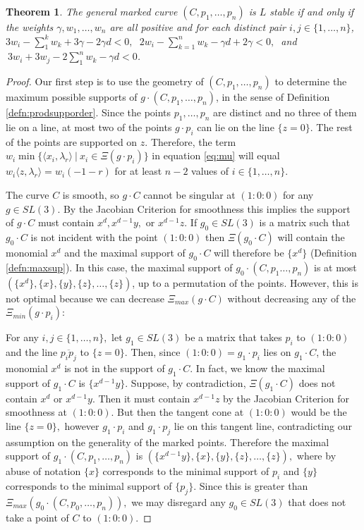\documentclass{amsart}
\numberwithin{equation}{section}
\newtheorem{thm}[prop]{Theorem}
\theoremstyle{definition}
\begin{document}
\begin{thm}\label{thm:generic}
The general marked curve $(C,p_1, \dots, p_n)$ is $L$ stable if and only if the weights $\gamma, w_1, \dots , w_n$ are all positive and for each distinct pair $i,j \in \{1, \dots , n\}$, $3w_i - \sum_1^k w_k + 3 \gamma -2 \gamma d < 0, \  $ $2w_i - \sum_{k=1}^n w_k - \gamma d + 2 \gamma < 0,  \ $ and $ \ 3w_i + 3w_j - 2 \sum_1^n w_k - \gamma d < 0$.
    
\end{thm}
\begin{proof}
 Our first step is to use the geometry of $(C,p_1, \dots , p_n)$ to determine the maximum possible supports of $g \cdot (C,p_1, \dots , p_n)$, in the sense of Definition \ref{defn:prodsupporder}. Since the points $p_1, \dots , p_n$ are distinct and no three of them lie on a line, at most two of the points $g \cdot p_i$ can lie on the line $\{z=0\}.$ The rest of the points are supported on $z$. Therefore, the term $w_i \min \{ \langle x_i , \lambda_r \rangle \ | \ x_i \in \Xi(g \cdot p_i) \}$ in equation \ref{eq:mu} will equal $w_i \langle z, \lambda_r \rangle = w_i(-1-r)$ for at least $n-2$ values of $i \in \{1, \dots, n\}$.
      
      The curve $C$ is smooth, so $g \cdot C$ cannot be singular at $(1:0:0)$ for any $g \in SL(3)$. By the Jacobian Criterion for smoothness this implies the support of $g \cdot C$ must contain $x^d, x^{d-1}y,$ or $x^{d-1}z$. If $g_0 \in SL(3)$ is a matrix such that $g_0 \cdot C$ is not incident with the point $(1:0:0)$ then $\Xi(g_0 \cdot C)$ will contain the monomial $x^d$ and the maximal support of $g_0 \cdot C$ will therefore be $\{x^d\}$ (Definition \ref{defn:maxsup}). In this case, the maximal support of $g_0 \cdot (C, p_1 \dots , p_n)$ is at most $(\{x^d\}, \{x\}, \{y\}, \{z\}, \dots , \{z\})$, up to a permutation of the points. However, this is not optimal because we can decrease $\Xi_{max}(g \cdot C)$ without decreasing any of the $\Xi_{min}(g \cdot p_i):$
      
      For any $i,j \in \{1, \dots ,n\},$ let $g_1 \in SL(3) $ be a matrix that takes $p_i$ to $(1:0:0)$ and the line $\overline{p_ip_j}$ to $\{z=0\}$. Then, since $(1:0:0) = g_1 \cdot p_i$ lies on $g_1 \cdot C$, the monomial $x^d$ is not in the support of $g_1 \cdot C.$ In fact, we know the maximal support of $g_1 \cdot C$ is $\{x^{d-1}y\}.$ Suppose, by contradiction, $\Xi(g_1 \cdot C)$ does not contain $x^d$ or $x^{d-1}y$. Then it must contain $x^{d-1}z$ by the Jacobian Criterion for smoothness at $(1:0:0).$ But then the tangent cone at $(1:0:0)$ would be the line $\{z=0\},$ however $g_1 \cdot p_i$ and $g_1 \cdot p_j$ lie on this tangent line, contradicting our assumption on the generality of the marked points. Therefore the maximal support of $g_1 \cdot (C, p_1, \dots , p_n)$ is $(\{x^{d-1}y\}, \{x\}, \{y\}, \{z\}, \dots , \{z\}),$ where by abuse of notation $\{x\}$ corresponds to the minimal support of $p_i$ and $\{y\}$ corresponds to the minimal support of $\{p_j\}$. Since this is greater than $\Xi_{max}(g_0 \cdot (C, p_0, \dots , p_n)),$ we may disregard any $g_0 \in SL(3)$ that does not take a point of $C$ to $(1:0:0).$
      

\end{proof}
\end{document}
